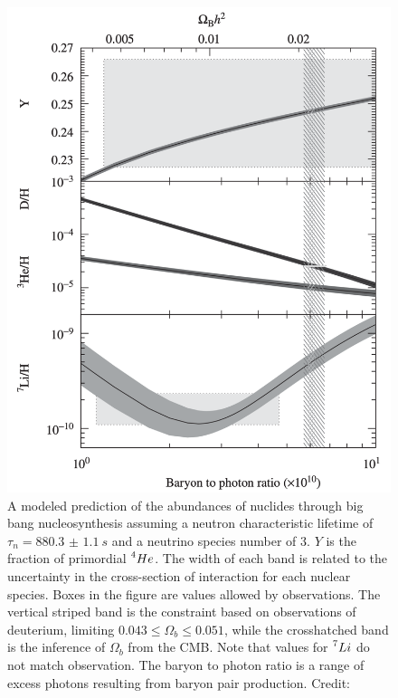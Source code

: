 \documentclass{paper}
\begin{document}
  \begin{figure}[H]
    \begin{centering}
    \includegraphics[scale=0.4]{BBN-ratios.pdf}
    \caption{A modeled prediction of the abundances of nuclides through big
      bang nucleosynthesis assuming a neutron characteristic lifetime of
      \(\tau_n = \SI{880.3(11)}{s}\) and a neutrino species number of 3. 
      \(Y\) is the fraction of primordial \(\prescript{4}{}{He}\). The width 
      of each band is related to the uncertainty in the cross-section of 
      interaction for each nuclear species. Boxes in the figure are values 
      allowed by observations. The vertical striped band is the constraint 
      based on observations of deuterium, limiting 
      \(0.043 \leq \Omega_b \leq 0.051\), while the crosshatched band 
      is the inference of \(\Omega_b\) from the CMB. Note that values for 
      \(\prescript{7}{}{Li}\) do not match observation. The baryon to photon 
      ratio is a range of excess photons resulting from baryon pair 
      production.
    Credit: \cite{liddle2015introduction}}
    \label{fig:BBN-ratios}
    \end{centering}
  \end{figure}
\end{document}
